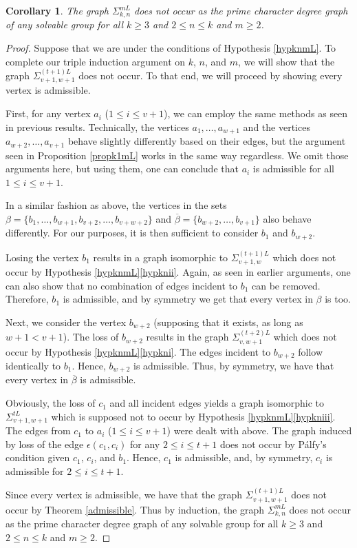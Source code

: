 \documentclass[11pt]{amsart}
\newtheorem{corollary}[theorem]{Corollary}
\theoremstyle{definition}
\theoremstyle{remark}
\numberwithin{equation}{section}
\newcommand{\SLi}[3]{\Sigma_{#1,#2}^{#3L}} %
\begin{document}
\begin{corollary}\label{corknmL}
The graph $\SLi{k}{n}{m}$ does not occur as the prime character degree graph of any solvable group for all $k\geq3$ and $2\leq n\leq k$ and $m\geq2$.
\end{corollary}
\begin{proof}
Suppose that we are under the conditions of Hypothesis \ref{hypknmL}.
To complete our triple induction argument on $k$, $n$, and $m$, we will show that the graph $\SLi{v+1}{w+1}{(t+1)}$ does not occur.
To that end, we will proceed by showing every vertex is admissible.

First, for any vertex $a_i$ ($1\leq i\leq v+1$), we can employ the same methods as seen in previous results. Technically, the vertices $a_1,\ldots,a_{w+1}$ and the vertices $a_{w+2},\ldots,a_{v+1}$ behave slightly differently based on their edges, but the argument seen in Proposition \ref{propk1mL} works in the same way regardless. We omit those arguments here, but using them, one can conclude that $a_i$ is admissible for all $1\leq i\leq v+1$. 

In a similar fashion as above, the vertices in the sets $\beta=\{b_1,\ldots,b_{w+1},b_{v+2},\ldots,b_{v+w+2}\}$ and $\overline{\beta}=\{b_{w+2},\ldots,b_{v+1}\}$ also behave differently. For our purposes, it is then sufficient to consider $b_1$ and $b_{w+2}$.

Losing the vertex $b_1$ results in a graph isomorphic to $\SLi{v+1}{w}{(t+1)}$ which does not occur by Hypothesis \ref{hypknmL}\eqref{hypknii}. Again, as seen in earlier arguments, one can also show that no combination of edges incident to $b_1$ can be removed. Therefore, $b_1$ is admissible, and by symmetry we get that every vertex in $\beta$ is too.

Next, we consider the vertex $b_{w+2}$ (supposing that it exists, as long as $w+1<v+1$). The loss of $b_{w+2}$ results in the graph $\SLi{v}{w+1}{(t+2)}$ which does not occur by Hypothesis \ref{hypknmL}\eqref{hypkni}. The edges incident to $b_{w+2}$ follow identically to $b_1$. Hence, $b_{w+2}$ is admissible. Thus, by symmetry, we have that every vertex in $\overline{\beta}$ is admissible.

Obviously, the loss of $c_1$ and all incident edges yields a graph isomorphic to $\SLi{v+1}{w+1}{t}$ which is supposed not to occur by Hypothesis \ref{hypknmL}\eqref{hypkniii}.
The edges from $c_1$ to $a_i$ ($1 \leq i \leq v+1$) were dealt with above.
The graph induced by loss of the edge $\epsilon(c_1,c_i)$ for any $2\leq i \leq t+1$ does not occur by P\'alfy's condition given $c_1$, $c_i$, and $b_1$.
Hence, $c_1$ is admissible, and, by symmetry, $c_i$ is admissible for $2\leq i\leq t+1$. 

Since every vertex is admissible, we have that the graph $\SLi{v+1}{w+1}{(t+1)}$ does not occur by Theorem \ref{admissible}. Thus by induction, the graph $\SLi{k}{n}{m}$ does not occur as the prime character degree graph of any solvable group for all $k\geq3$ and $2\leq n\leq k$ and $m\geq2$.
\end{proof}
\end{document}
